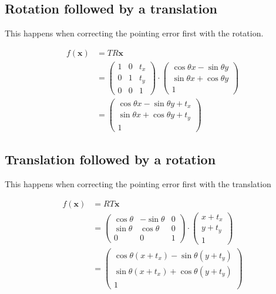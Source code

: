 \documentclass[paper=a4, fontsize=11pt, onecolumn, tikz, dvipsnames, svgnames, x11names]{article}
\begin{document}
\subsection{Rotation followed by a translation}
This happens when correcting the pointing error first with the rotation.

\begin{align*}
    f(\bm{x}) &= TR\bm{x} \\
    &=
    \begin{pmatrix}
    1 & 0 & t_x \\
    0 & 1 & t_y \\
    0 & 0 & 1
    \end{pmatrix}
    \cdot
    \begin{pmatrix}
    \cos \theta x - \sin \theta y \\
    \sin \theta x + \cos \theta y \\
    1
    \end{pmatrix}
    \\
    &=
    \begin{pmatrix}
    \cos \theta x - \sin \theta y + t_x\\
    \sin \theta x + \cos \theta y + t_y\\
    1
    \end{pmatrix}
\end{align*}

\subsection{Translation followed by a rotation}
This happens when correcting the pointing error first with the translation

\begin{align*}
    f(\bm{x}) &= RT\bm{x} \\
    &=
    \begin{pmatrix}
    \cos \theta & -\sin \theta & 0 \\
    \sin \theta & \cos \theta & 0 \\
    0 & 0 & 1
    \end{pmatrix}
    \cdot
    \begin{pmatrix}
    x + t_x \\
    y + t_y \\
    1
    \end{pmatrix} \\
    &=
    \begin{pmatrix}
    \cos \theta (x + t_x) - \sin \theta (y + t_y)\\
    \sin \theta (x + t_x) + \cos \theta (y + t_y)\\
    1
    \end{pmatrix}
\end{align*}




\end{document}
